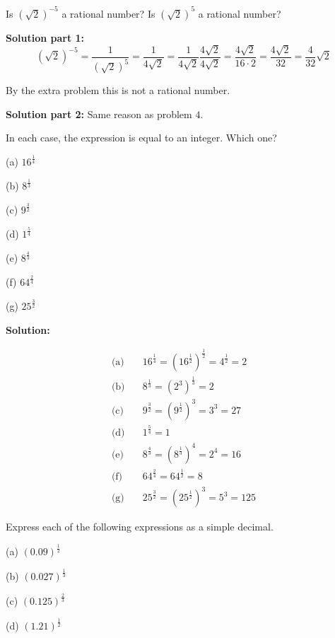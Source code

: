 \begin{tcolorbox}[title=Problem 5, breakable]
    Is $(\sqrt{2})^{-5}$ a rational number? Is $(\sqrt{2})^5$ a rational number?
\end{tcolorbox}

\textbf{Solution part 1:}
\[(\sqrt{2})^{-5} 
    = \frac{1}{(\sqrt{2})^5} 
    = \frac{1}{4 \sqrt{2}} 
    = \frac{1}{4 \sqrt{2}} \frac{4 \sqrt{2}}{4 \sqrt{2}} 
    = \frac{4 \sqrt{2}}{16 \cdot 2}
    = \frac{4 \sqrt{2}}{32}
    = \frac{4}{32} \sqrt{2} \]

By the extra problem this is not a rational number.

\textbf{Solution part 2:}
Same reason as problem $4$.

\begin{tcolorbox}[title=Problem 6, breakable]
    In each case, the expression is equal to an integer. Which one?

    (a) $16^{\frac{1}{4}}$

    (b) $8^{\frac{1}{3}}$

    (c) $9^{\frac{3}{2}}$

    (d) $1^{\frac{5}{4}}$

    (e) $8^{\frac{4}{3}}$

    (f) $64^{\frac{2}{4}}$

    (g) $25^{\frac{3}{2}}$
\end{tcolorbox}

\textbf{Solution:}

\begin{align*}
\text{(a)}\quad & 16^{\frac{1}{4}} = (16^{\frac{1}{2}})^{\frac{1}{2}} = 4^{\frac{1}{2}} = 2 \\
\text{(b)}\quad & 8^{\frac{1}{3}} = (2^3)^{\frac{1}{3}} = 2 \\
\text{(c)}\quad & 9^{\frac{3}{2}} = (9^{\frac{1}{2}})^3 = 3^3 = 27 \\
\text{(d)}\quad & 1^{\frac{5}{4}} = 1 \\
\text{(e)}\quad & 8^{\frac{4}{3}} = (8^{\frac{1}{3}})^4 = 2^4 = 16 \\
\text{(f)}\quad & 64^{\frac{2}{4}} = 64^{\frac{1}{2}} = 8 \\
\text{(g)}\quad & 25^{\frac{3}{2}} = (25^{\frac{1}{2}})^3 = 5^3 = 125
\end{align*}

\begin{tcolorbox}[title=Problem 7, breakable]
    Express each of the following expressions as a simple decimal.

    (a) $(0.09)^\frac{1}{2}$

    (b) $(0.027)^\frac{1}{3}$

    (c) $(0.125)^\frac{2}{3}$

    (d) $(1.21)^\frac{1}{2}$
\end{tcolorbox}

